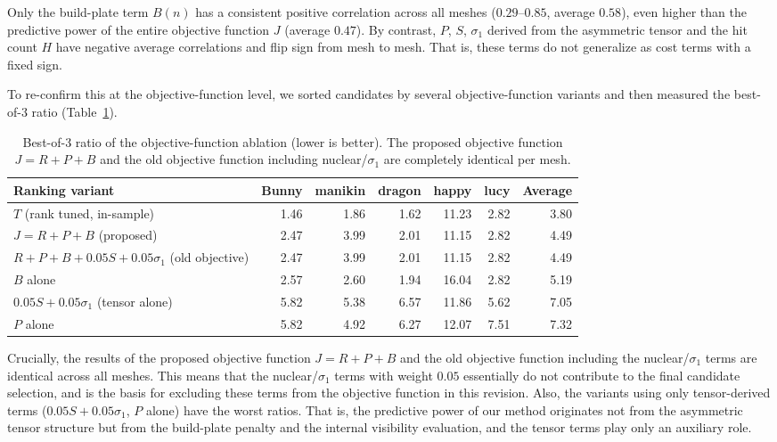 \documentclass[11pt,a4paper]{article}
\begin{document}
Only the build-plate term $B(n)$ has a consistent positive correlation across all meshes ($0.29$--$0.85$, average $0.58$),
even higher than the predictive power of the entire objective function $J$ (average $0.47$).
By contrast, $P$, $S$, $\sigma_1$ derived from the asymmetric tensor and the hit count $H$ have negative average correlations
and flip sign from mesh to mesh. That is, these terms do not generalize as cost terms with a fixed sign.

To re-confirm this at the objective-function level, we sorted candidates by several objective-function variants and then
measured the best-of-3 ratio (Table~\ref{tab:ablation}).

\begin{table}[H]
\centering
\caption{Best-of-3 ratio of the objective-function ablation (lower is better).
The proposed objective function $J=R+P+B$ and the old objective function including nuclear/$\sigma_1$ are completely identical per mesh.}
\label{tab:ablation}
\begin{tabular}{lrrrrrr}
\toprule
Ranking variant & Bunny & manikin & dragon & happy & lucy & Average\\
\midrule
$T$ (rank tuned, in-sample) & 1.46 & 1.86 & 1.62 & 11.23 & 2.82 & 3.80\\
$J=R+P+B$ (proposed)            & 2.47 & 3.99 & 2.01 & 11.15 & 2.82 & 4.49\\
$R{+}P{+}B{+}0.05S{+}0.05\sigma_1$ (old objective) & 2.47 & 3.99 & 2.01 & 11.15 & 2.82 & 4.49\\
$B$ alone                     & 2.57 & 2.60 & 1.94 & 16.04 & 2.82 & 5.19\\
$0.05S+0.05\sigma_1$ (tensor alone) & 5.82 & 5.38 & 6.57 & 11.86 & 5.62 & 7.05\\
$P$ alone                     & 5.82 & 4.92 & 6.27 & 12.07 & 7.51 & 7.32\\
\bottomrule
\end{tabular}
\end{table}

Crucially, the results of the proposed objective function $J=R+P+B$ and the old objective function including the nuclear/$\sigma_1$ terms are identical across all meshes.
This means that the nuclear/$\sigma_1$ terms with weight $0.05$ essentially do not contribute to the final candidate selection,
and is the basis for excluding these terms from the objective function in this revision.
Also, the variants using only tensor-derived terms ($0.05S+0.05\sigma_1$, $P$ alone) have the worst ratios.
That is, the predictive power of our method originates not from the asymmetric tensor structure but from the build-plate penalty and the internal visibility evaluation,
and the tensor terms play only an auxiliary role.
\end{document}
